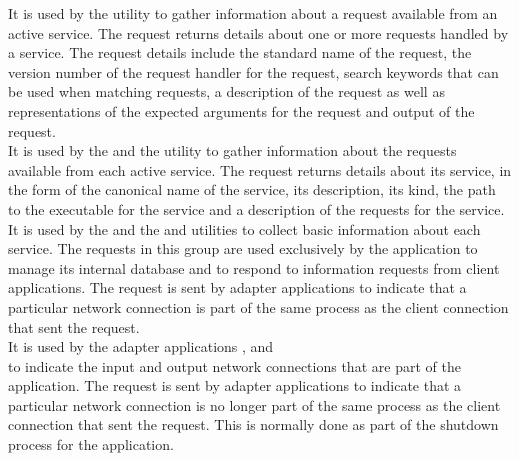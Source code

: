 It is used by the  utility to gather information about a
request available from an active service.
The  request returns details about one or more requests
handled by a service.
The request details include the standard name of the request, the version number of the
request handler for the request, search keywords that can be used when matching requests,
a description of the request as well as representations of the expected arguments for the
request and output of the request.\\

It is used by the  and the
 utility to gather information about the requests available
from each active service.
The  request returns details about its service, in the
form of the canonical name of the service, its description, its kind, the path to the
executable for the service and a description of the requests for the service.\\

It is used by the  and the
 and 
utilities to collect basic information about each service.
\secondaryEnd{}
The requests in this group are used exclusively by the
 application to manage its internal
database and to respond to information requests from client applications.
The  request is sent by
adapter applications to indicate that a particular \yarp{} network connection is part of
the same process as the client connection that sent the request.\\

It is used by the adapter applications ,
 and\\
 to indicate the input and output
\yarp{} network connections that are part of the application.
The  request is sent by
adapter applications to indicate that a particular \yarp{} network connection is no
longer part of the same process as the client connection that sent the request.
This is normally done as part of the shutdown process for the application.\\

